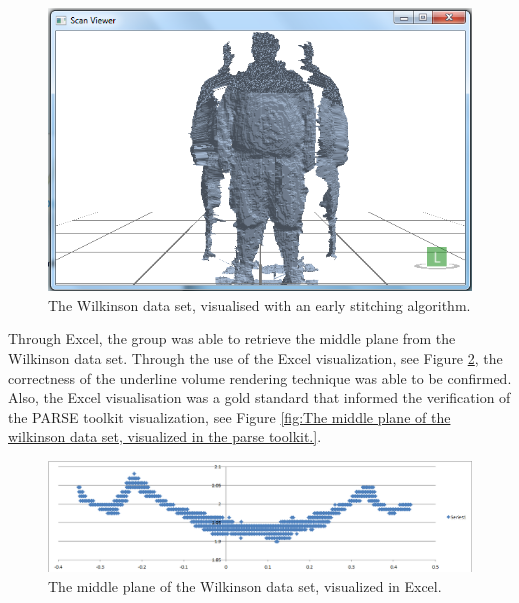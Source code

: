 \begin{figure}[h]
\begin{center}
\includegraphics[scale=0.4]{./testing/wilko1} 
\end{center}
\caption{The Wilkinson data set, visualised with an early stitching algorithm.}
\label{fig:the wilkinson data set, visualised with an early stitching algorithm}
\end{figure}

Through Excel, the group was able to retrieve the middle plane from the Wilkinson data set. 
Through the use of the Excel visualization, see Figure \ref{fig:the middle plane of the Wilkinson data set, visualized in excel.}, the correctness of the underline volume rendering technique was able to be confirmed.
Also, the Excel visualisation was a gold standard that informed the verification of the PARSE toolkit visualization, see Figure \ref{fig:The middle plane of the wilkinson data set, visualized in the parse toolkit.}.\\ 

\begin{figure}[h]
\begin{center}
\includegraphics[scale=0.4]{./testing/wilko2} 
\end{center}
\caption{The middle plane of the Wilkinson data set, visualized in Excel.}
\label{fig:the middle plane of the Wilkinson data set, visualized in excel.}
\end{figure}

